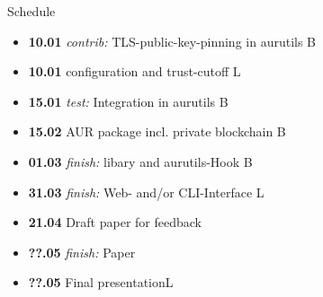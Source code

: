 \documentclass{beamer}
\begin{document}
\begin{frame}{Schedule}
\begin{itemize}
	\item \textbf{10.01} \emph{contrib:} TLS-public-key-pinning in aurutils \hfill B
	\item \textbf{10.01} configuration and trust-cutoff \hfill L
	\item \textbf{15.01} \emph{test:} \alert{Integration in aurutils} \hfill B
	\item \textbf{15.02} \alert{AUR package} incl. private blockchain \hfill B
	\item \textbf{01.03} \emph{finish:} libary and aurutils-Hook \hfill B
	\item \textbf{31.03} \emph{finish:} Web- and/or CLI-Interface \hfill L
	\item \textbf{21.04} \alert{Draft paper} for feedback\hfill
	\item \textbf{??.05} \emph{finish:} Paper\hfill
	\item \textbf{??.05} Final presentation\hfill L
\end{itemize}
\end{frame}
\end{document}
